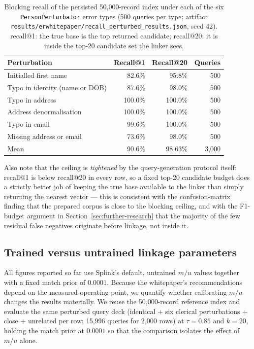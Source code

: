 \documentclass[11pt]{article}
\begin{document}
\begin{table}[h]
\centering
\caption{Blocking recall of the persisted 50{,}000-record index under each of the six \texttt{PersonPerturbator} error types (500 queries per type; artifact \texttt{results/erwhitepaper/recall\_perturbed\_results.json}, seed 42). recall@1: the true base is the top returned candidate; recall@20: it is inside the top-20 candidate set the linker sees.}
\label{tab:blocking-recall-perturbed}
\small
\begin{tabular}{lrrr}
\toprule
Perturbation & Recall@1 & Recall@20 & Queries \\
\midrule
Initialled first name & 82.6\% & 95.8\% & 500 \\
Typo in identity (name or DOB) & 87.6\% & 98.0\% & 500 \\
Typo in address & 100.0\% & 100.0\% & 500 \\
Address denormalisation & 100.0\% & 100.0\% & 500 \\
Typo in email & 99.6\% & 100.0\% & 500 \\
Missing address or email & 73.6\% & 98.0\% & 500 \\
\midrule
Mean & 90.6\% & 98.63\% & 3{,}000 \\
\bottomrule
\end{tabular}
\end{table}

Also note that the ceiling is \emph{tightened} by the query-generation protocol itself: recall@1 is below recall@20 in every row, so a fixed top-20 candidate budget does a strictly better job of keeping the true base available to the linker than simply returning the nearest vector --- this is consistent with the confusion-matrix finding that the prepared corpus is close to the blocking ceiling, and with the F1-budget argument in Section~\ref{sec:further-research} that the majority of the few residual false negatives originate before linkage, not inside it.

\subsection{Trained versus untrained linkage parameters}
\label{sec:mu-calibration}
All figures reported so far use Splink's default, untrained $m/u$ values together with a fixed match prior of $0.0001$. Because the whitepaper's recommendations depend on the measured operating point, we quantify whether calibrating $m/u$ changes the results materially. We reuse the 50{,}000-record reference index and evaluate the same perturbed query deck (identical + six clerical perturbations + close + unrelated per row; 15{,}996 queries for 2{,}000 rows) at $\tau=0.85$ and $k=20$, holding the match prior at $0.0001$ so that the comparison isolates the effect of $m/u$ alone.
\end{document}
